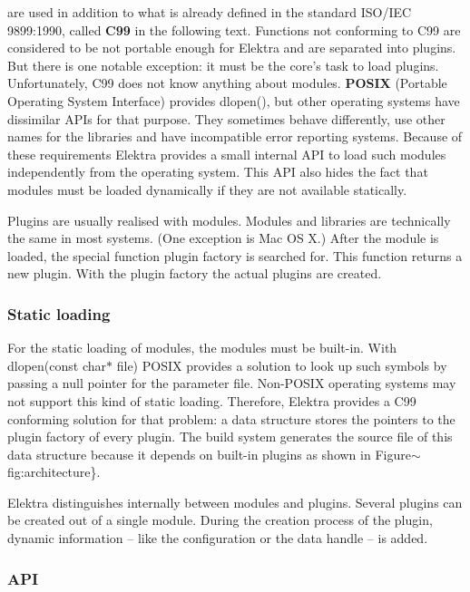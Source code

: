 are used in addition to what is already defined in the standard I\+S\+O/\+I\+E\+C 9899\+:1990, called {\bfseries C99} in the following text. Functions not conforming to C99 are considered to be not portable enough for Elektra and are separated into plugins. But there is one notable exception\+: it must be the core's task to load plugins. Unfortunately, C99 does not know anything about modules. {\bfseries P\+O\+S\+I\+X} (Portable Operating System Interface) provides {\ttfamily dlopen()}, but other operating systems have dissimilar A\+P\+Is for that purpose. They sometimes behave differently, use other names for the libraries and have incompatible error reporting systems. Because of these requirements Elektra provides a small internal A\+P\+I to load such modules independently from the operating system. This A\+P\+I also hides the fact that modules must be loaded dynamically if they are not available statically.

Plugins are usually realised with modules. Modules and libraries are technically the same in most systems. (One exception is Mac O\+S X.) After the module is loaded, the special function plugin factory is searched for. This function returns a new plugin. With the plugin factory the actual plugins are created.

\subsubsection*{Static loading}

For the static loading of modules, the modules must be built-\/in. With {\ttfamily dlopen(const} {\ttfamily char$\ast$} {\ttfamily file)} P\+O\+S\+I\+X provides a solution to look up such symbols by passing a null pointer for the parameter {\ttfamily file}. Non-\/\+P\+O\+S\+I\+X operating systems may not support this kind of static loading. Therefore, Elektra provides a C99 conforming solution for that problem\+: a data structure stores the pointers to the plugin factory of every plugin. The build system generates the source file of this data structure because it depends on built-\/in plugins as shown in Figure$\sim$fig\+:architecture\}.

Elektra distinguishes internally between modules and plugins. Several plugins can be created out of a single module. During the creation process of the plugin, dynamic information -- like the configuration or the data handle -- is added.

\subsubsection*{A\+P\+I}


